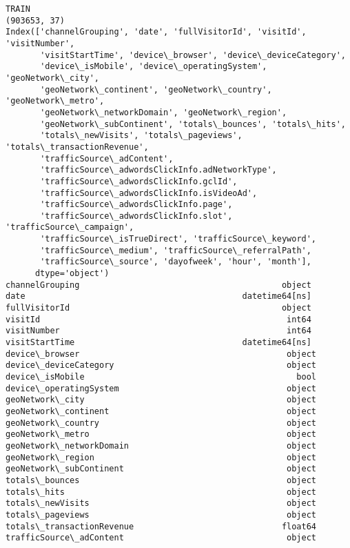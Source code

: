 \documentclass[11pt]{article}
\begin{document}
    \begin{Verbatim}[commandchars=\\\{\}]
TRAIN
(903653, 37)
Index(['channelGrouping', 'date', 'fullVisitorId', 'visitId', 'visitNumber',
       'visitStartTime', 'device\_browser', 'device\_deviceCategory',
       'device\_isMobile', 'device\_operatingSystem', 'geoNetwork\_city',
       'geoNetwork\_continent', 'geoNetwork\_country', 'geoNetwork\_metro',
       'geoNetwork\_networkDomain', 'geoNetwork\_region',
       'geoNetwork\_subContinent', 'totals\_bounces', 'totals\_hits',
       'totals\_newVisits', 'totals\_pageviews', 'totals\_transactionRevenue',
       'trafficSource\_adContent',
       'trafficSource\_adwordsClickInfo.adNetworkType',
       'trafficSource\_adwordsClickInfo.gclId',
       'trafficSource\_adwordsClickInfo.isVideoAd',
       'trafficSource\_adwordsClickInfo.page',
       'trafficSource\_adwordsClickInfo.slot', 'trafficSource\_campaign',
       'trafficSource\_isTrueDirect', 'trafficSource\_keyword',
       'trafficSource\_medium', 'trafficSource\_referralPath',
       'trafficSource\_source', 'dayofweek', 'hour', 'month'],
      dtype='object')
channelGrouping                                         object
date                                            datetime64[ns]
fullVisitorId                                           object
visitId                                                  int64
visitNumber                                              int64
visitStartTime                                  datetime64[ns]
device\_browser                                          object
device\_deviceCategory                                   object
device\_isMobile                                           bool
device\_operatingSystem                                  object
geoNetwork\_city                                         object
geoNetwork\_continent                                    object
geoNetwork\_country                                      object
geoNetwork\_metro                                        object
geoNetwork\_networkDomain                                object
geoNetwork\_region                                       object
geoNetwork\_subContinent                                 object
totals\_bounces                                          object
totals\_hits                                             object
totals\_newVisits                                        object
totals\_pageviews                                        object
totals\_transactionRevenue                              float64
trafficSource\_adContent                                 object

\end{Verbatim}
\end{document}

